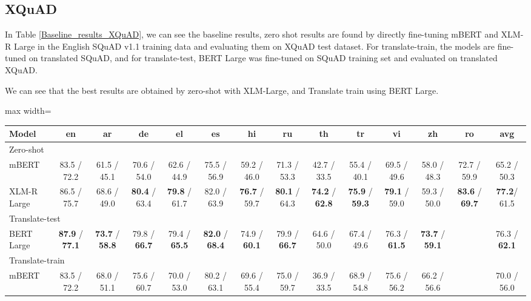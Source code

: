 \documentclass[11pt]{article}
\begin{document}
\subsection{XQuAD}

In Table \ref{Baseline_results_XQuAD}, we can see the baseline results, zero shot results are found by directly fine-tuning mBERT and XLM-R Large in the English SQuAD v1.1 training data and evaluating them on XQuAD test dataset. For translate-train, the models are fine-tuned on translated SQuAD, and for translate-test, BERT Large was fine-tuned on SQuAD training set and evaluated on translated XQuAD.

We can see that the best results are obtained by zero-shot with XLM-Large, and Translate train using BERT Large.

\begin{table*}[!ht]
    \centering
    \begin{adjustbox}{max width=\textwidth}
    \begin{tabular}{l|cccccccccccc|c}
    \toprule
        Model & en & ar & de & el & es & hi & ru & th & tr & vi & zh & ro & avg \\ \midrule
        \multicolumn{14}{l}{Zero-shot} \\ \midrule
        mBERT & 83.5 / 72.2 & 61.5 / 45.1 & 70.6 / 54.0 & 62.6 / 44.9 & 75.5 / 56.9 & 59.2 / 46.0 & 71.3 / 53.3 & 42.7 / 33.5 & 55.4 / 40.1 & 69.5 / 49.6 & 58.0 / 48.3 & 72.7 / 59.9 & 65.2 / 50.3 \\ 
        XLM-R Large & 86.5 / 75.7 & 68.6 / 49.0 & \textbf{80.4} / 63.4 & \textbf{79.8} / 61.7 & 82.0 / 63.9 & \textbf{76.7} / 59.7 & \textbf{80.1} / 64.3 & \textbf{74.2} / \textbf{62.8} & \textbf{75.9} / \textbf{59.3} & \textbf{79.1} / 59.0 & 59.3 / 50.0 & \textbf{83.6} / \textbf{69.7} & \textbf{77.2}/ 61.5 \\ \midrule
        \multicolumn{14}{l}{Translate-test} \\ \midrule
        BERT Large & \textbf{87.9} / \textbf{77.1} & \textbf{73.7} / \textbf{58.8} & 79.8 / \textbf{66.7} & 79.4 / \textbf{65.5} & \textbf{82.0} / \textbf{68.4} & 74.9 / \textbf{60.1} & 79.9 / \textbf{66.7} & 64.6 / 50.0 & 67.4 / 49.6 & 76.3 / \textbf{61.5} & \textbf{73.7} / \textbf{59.1} & ~ & 76.3 / \textbf{62.1} \\ \midrule
        \multicolumn{14}{l}{Translate-train} \\ \midrule
        mBERT & 83.5 / 72.2 & 68.0 / 51.1 & 75.6 / 60.7 & 70.0 / 53.0 & 80.2 / 63.1 & 69.6 / 55.4 & 75.0 / 59.7 & 36.9 / 33.5 & 68.9 / 54.8 & 75.6 / 56.2 & 66.2 / 56.6 & ~ & 70.0 / 56.0 \\ 
        \bottomrule
    \end{tabular}
    \end{adjustbox}
    \caption{Baseline results (F1/EM) for each language in XQuAD dataset.}
    \label{Baseline_results_XQuAD}
\end{table*}
\end{document}
